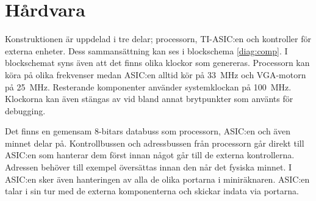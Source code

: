 \documentclass[main.tex]{subfiles}
\begin{document}
\section{Hårdvara}
Konstruktionen är uppdelad i tre delar; processorn, TI-ASIC:en och kontroller
för externa enheter. Dess sammansättning kan ses i blockschema \ref{diag:comp}.
I blockschemat syns även att det finns olika klockor som genereras. Processorn
kan köra på olika frekvenser medan ASIC:en alltid kör på \SI{33}{\mega\hertz}
och VGA-motorn på \SI{25}{\mega\hertz}. Resterande komponenter använder
systemklockan på \SI{100}{\mega\hertz}. Klockorna kan även stängas av vid bland
annat brytpunkter som använts för debugging.

Det finns en gemensam 8-bitars databuss som processorn, ASIC:en och även minnet
delar på. Kontrollbussen och adressbussen från processorn går direkt till
ASIC:en som hanterar dem först innan något går till de externa kontrollerna.
Adressen behöver till exempel översättas innan den når det fysiska minnet. I
ASIC:en sker även hanteringen av alla de olika portarna i miniräknaren. ASIC:en
talar i sin tur med de externa komponenterna och skickar indata via portarna.




\end{document}
